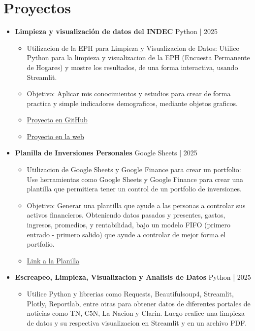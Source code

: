 \documentclass[11pt, a4paper]{article}
\newcommand{\cvitem}[2]{\textbf{#1} \hfill \color{secondary}#2} %
\begin{document}
\section*{Proyectos}
\begin{itemize}[leftmargin=*]
    \item \cvitem{Limpieza y visualización de datos del INDEC}{Python | 2025}
    \begin{itemize}
        \item Utilizacion de la EPH para Limpieza y Visualizacion de Datos: Utilice Python para la limpieza y visualizacion de la EPH (Encuesta Permanente de Hogares) y mostre los resultados, de una forma interactiva, usando Streamlit.
        \item Objetivo: Aplicar mis conocimientos y estudios para crear de forma practica y simple indicadores demograficos, mediante objetos graficos.
        \item \href{https://github.com/JoacoLucen/EPH-Insight-App}{Proyecto en GitHub}
        \item \href{https://eph-insight-app-joacolucentini.streamlit.app/}{Proyecto en la web}
    \end{itemize}
    \item \cvitem{Planilla de Inversiones Personales}{Google Sheets | 2025}
    \begin{itemize}
        \item Utilizacion de Google Sheets y Google Finance para crear un portfolio: Use herramientas como Google Sheets y Google Finance para crear una plantilla que permitiera tener un control de un portfolio de inversiones.
        \item Objetivo: Generar una plantilla que ayude a las personas a controlar sus activos financieros. Obteniendo datos pasados y presentes, gastos, ingresos, promedios, y rentabilidad, bajo un modelo FIFO (primero entrado - primero salido) que ayude a controlar de mejor forma el portfolio.
        \item \href{https://docs.google.com/spreadsheets/d/1MOAbafLv-NISA2nb2gy0AmwRGHegZyXV7TNal1StVgE/edit?usp=sharing}{Link a la Planilla}
    \end{itemize}
    \cvitem { }
    \item \cvitem{Escreapeo, Limpieza, Visualizacion y Analisis de Datos}{Python | 2025}
    \begin{itemize}
        \item Utilice Python y librerias como Requests, Beautifulsoup4, Streamlit, Plotly, Reportlab, entre otras para obtener datos de diferentes portales de noticias como TN, C5N, La Nacion y Clarin. Luego realice una limpieza de datos y su respectiva visualizacion en Streamlit y en un archivo PDF.

\end{itemize}
\end{itemize}
\end{document}
